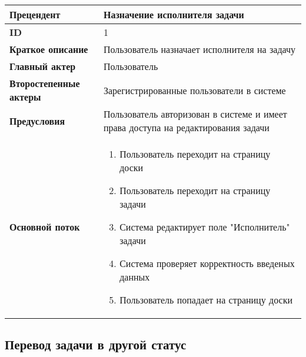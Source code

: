 \documentclass{article}
\begin{document}
\begin{tabular}{|l|p{9cm}|}
	\hline
	\textbf{Прецендент}            & Назначение исполнителя задачи                                                     \\
	\hline
	\textbf{ID}                    & 1                                                                                 \\
	\hline
	\textbf{Краткое описание}      & Пользователь назначает исполнителя на задачу                                      \\
	\hline
	\textbf{Главный актер}         & Пользователь                                                                      \\
	\hline
	\textbf{Второстепенные актеры} & Зарегистрированные пользователи в системе                                         \\
	\hline
	\textbf{Предусловия}           & Пользователь авторизован в системе и имеет права доступа на редактирования задачи \\
	\hline
	\textbf{Основной поток}        & \begin{enumerate}
		                                 \item Пользователь переходит на страницу доски
		                                 \item Пользователь переходит на страницу задачи
		                                 \item Система редактирует поле "Исполнитель" задачи
		                                 \item Система проверяет корректность введеных данных
		                                 \item Пользователь попадает на страницу доски
	                                 \end{enumerate}                               \\
	\hline
\end{tabular}

\subsection{Перевод задачи в другой статус}
\end{document}
